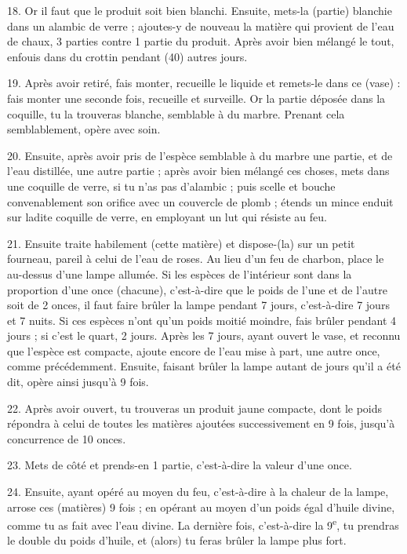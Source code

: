 \documentclass[a4paper, 11pt, oneside, polutonikogreek, french]{article}
\begin{document}
18. Or il faut que le produit soit bien blanchi. Ensuite, mets-la (partie) blanchie dans un alambic de verre ; ajoutes-y de nouveau la matière qui provient de l'eau de chaux, 3 parties contre 1 partie du produit. Après avoir bien mélangé le tout, enfouis dans du crottin pendant (40) autres jours.

19. Après avoir retiré, fais monter, recueille le liquide et remets-le dans ce (vase) : fais monter une seconde fois, recueille et surveille. Or la partie déposée dans la coquille, tu la trouveras blanche, semblable à du marbre. Prenant cela semblablement, opère avec soin.

20. Ensuite, après avoir pris de l'espèce semblable à du marbre une partie, et de l'eau distillée, une autre partie ; après avoir bien mélangé ces choses, mets dans une coquille de verre, si tu n'as pas d'alambic ; puis scelle et bouche convenablement son orifice avec un couvercle de plomb ; étends un mince enduit sur ladite coquille de verre, en employant un lut qui résiste au feu.

21. Ensuite traite habilement (cette matière) et dispose-(la) sur un petit fourneau, pareil à celui de l'eau de roses. Au lieu d'un feu de charbon, place le au-dessus d'une lampe allumée. Si les espèces de l'intérieur sont dans la proportion d'une once (chacune), c'est-à-dire que le poids de l'une et de l'autre soit de 2 onces, il faut faire brûler la lampe pendant 7 jours, c'est-à-dire 7 jours et 7 nuits. Si ces espèces n'ont qu'un poids moitié moindre, fais brûler pendant 4 jours ; si c'est le quart, 2 jours. Après les 7 jours, ayant ouvert le vase, et reconnu que l'espèce est compacte, ajoute encore de l'eau mise à part, une autre once, comme précédemment. Ensuite, faisant brûler la lampe autant de jours qu'il a été dit, opère ainsi jusqu'à 9 fois.

22. Après avoir ouvert, tu trouveras un produit jaune compacte, dont le poids répondra à celui de toutes les matières ajoutées successivement en 9 fois, jusqu'à concurrence de 10 onces.

23. Mets de côté et prends-en 1 partie, c'est-à-dire la valeur d'une once.

24. Ensuite, ayant opéré au moyen du feu, c'est-à-dire à la chaleur de la lampe, arrose ces (matières) 9 fois ; en opérant au moyen d'un poids égal d'huile divine, comme tu as fait avec l'eau divine. La dernière fois, c'est-à-dire la 9\textsuperscript{e}, tu prendras le double du poids d'huile, et (alors) tu feras brûler la lampe plus fort.
\end{document}
